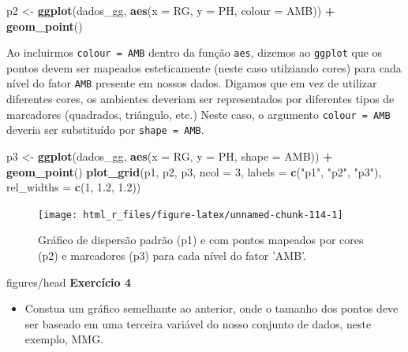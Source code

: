 \documentclass[
]{book}
\newenvironment{Shaded}{\begin{snugshade}}{\end{snugshade}}
\newcommand{\DataTypeTok}[1]{\textcolor[rgb]{0.13,0.29,0.53}{#1}}
\newcommand{\DecValTok}[1]{\textcolor[rgb]{0.00,0.00,0.81}{#1}}
\newcommand{\FloatTok}[1]{\textcolor[rgb]{0.00,0.00,0.81}{#1}}
\newcommand{\KeywordTok}[1]{\textcolor[rgb]{0.13,0.29,0.53}{\textbf{#1}}}
\newcommand{\NormalTok}[1]{#1}
\newcommand{\OperatorTok}[1]{\textcolor[rgb]{0.81,0.36,0.00}{\textbf{#1}}}
\newcommand{\StringTok}[1]{\textcolor[rgb]{0.31,0.60,0.02}{#1}}
\providecommand{\tightlist}{%
  \setlength{\itemsep}{0pt}\setlength{\parskip}{0pt}}
\numberwithin{equation}{section}
\newcommand{\indt}[1]{\index{#1|ST}}
\newenvironment{tarefa}
  {\begin{customBlockImage}[colframe=customOrange, title=Tarefa de casa]{figures/head}}
  {\end{customBlockImage}}
\begin{document}
\begin{Shaded}
\begin{Highlighting}[]
\NormalTok{p2 \textless{}{-}}\StringTok{ }\KeywordTok{ggplot}\NormalTok{(dados\_gg, }\KeywordTok{aes}\NormalTok{(}\DataTypeTok{x =}\NormalTok{ RG, }\DataTypeTok{y =}\NormalTok{ PH, }\DataTypeTok{colour =}\NormalTok{ AMB)) }\OperatorTok{+}
\StringTok{      }\KeywordTok{geom\_point}\NormalTok{()}
\end{Highlighting}
\end{Shaded}

Ao incluirmos \texttt{colour\ =\ AMB} dentro da função \texttt{aes}, dizemos ao \texttt{ggplot} que os pontos devem ser mapeados esteticamente (neste caso utilziando cores) para cada nível do fator \texttt{AMB} presente em nossos dados. Digamos que em vez de utilizar diferentes cores, os ambientes deveriam ser representados por diferentes tipos de marcadores (quadrados, triângulo, etc.) Neste caso, o argumento \texttt{colour\ =\ AMB} deveria ser substituído por \texttt{shape\ =\ AMB}.

\begin{Shaded}
\begin{Highlighting}[]
\NormalTok{p3 \textless{}{-}}\StringTok{ }\KeywordTok{ggplot}\NormalTok{(dados\_gg, }\KeywordTok{aes}\NormalTok{(}\DataTypeTok{x =}\NormalTok{ RG, }\DataTypeTok{y =}\NormalTok{ PH, }\DataTypeTok{shape =}\NormalTok{ AMB)) }\OperatorTok{+}
\StringTok{      }\KeywordTok{geom\_point}\NormalTok{()}
\KeywordTok{plot\_grid}\NormalTok{(p1, p2, p3,}
          \DataTypeTok{ncol =} \DecValTok{3}\NormalTok{,}
          \DataTypeTok{labels =} \KeywordTok{c}\NormalTok{(}\StringTok{"p1"}\NormalTok{, }\StringTok{"p2"}\NormalTok{, }\StringTok{"p3"}\NormalTok{),}
          \DataTypeTok{rel\_widths =} \KeywordTok{c}\NormalTok{(}\DecValTok{1}\NormalTok{, }\FloatTok{1.2}\NormalTok{, }\FloatTok{1.2}\NormalTok{))}
\end{Highlighting}
\end{Shaded}

\begin{figure}

{\centering \texttt{[image: html\_r\_files/figure-latex/unnamed-chunk-114-1]} 

}

\caption{Gráfico de dispersão padrão (p1) e com pontos mapeados por cores (p2) e marcadores (p3) para cada nível do fator 'AMB'.}\label{fig:unnamed-chunk-114}
\end{figure}

\indt{Exercícios}
\begin{tarefa}
\textbf{Exercício 4}

\begin{itemize}
\tightlist
\item
  Constua um gráfico semelhante ao anterior, onde o tamanho dos pontos deve ser baseado em uma terceira variável do nosso conjunto de dados, neste exemplo, MMG.
\end{itemize}
\end{tarefa}
\end{document}

